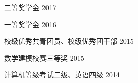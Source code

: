 
\begin{cventries}

\cvexperience
{二等奖学金}
{2017}

\cvexperience
{一等奖学金}
{2016}

\cvexperience
{校级优秀共青团员、校级优秀团干部}
{2015}

\cvexperience
{数学建模校赛三等奖}
{2015}

\cvexperience
{计算机等级考试二级、英语四级}
{2014}

\end{cventries}